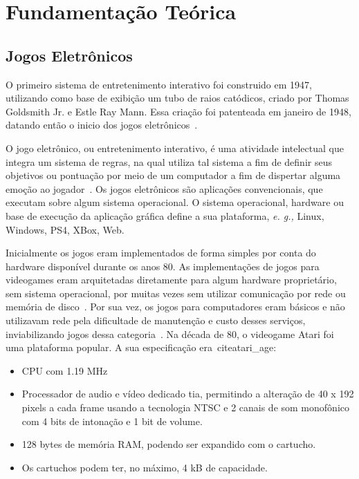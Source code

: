 \chapter{Fundamentação Teórica}
\label{cap2}

\section{Jogos Eletrônicos}

O primeiro sistema de entretenimento interativo foi construido em 1947, utilizando como base de exibição um tubo de raios catódicos, criado por Thomas Goldsmith Jr. e Estle Ray Mann.
%
Essa criação foi patenteada em janeiro de 1948, datando então o inicio dos jogos eletrônicos~\cite{Adams2014Jan, patents1947Jan}.



O jogo eletrônico, ou entretenimento interativo, é uma atividade intelectual que integra um sistema de regras, na qual utiliza tal sistema a fim de definir seus objetivos ou pontuação por meio de um computador a fim de dispertar alguma emoção ao jogador~\cite{video_game_technologies}.
%
Os jogos eletrônicos são aplicações convencionais, que executam sobre algum sistema operacional.
%
O sistema operacional, hardware ou base de execução da aplicação gráfica define a sua plataforma, \textit{e. g.,} Linux, Windows, PS4, XBox, Web.



Inicialmente os jogos eram implementados de forma simples por conta do hardware disponível durante os anos 80.
%
As implementações de jogos para videogames eram arquitetadas diretamente para algum hardware proprietário, sem sistema operacional, por muitas vezes sem utilizar comunicação por rede ou memória de disco~\cite{adams_1208533}.
%
Por sua vez, os jogos para computadores eram básicos e não utilizavam rede pela dificultade de manutenção e custo desses serviços, inviabilizando jogos dessa categoria~\cite{adams_1208533}.
%
Na década de 80, o videogame Atari foi uma plataforma popular. A sua especificação era~cite{atari_age}:

\begin{itemize}
  \item \ac{CPU} com 1.19 \ac{MHz}
  \item Processador de audio e vídeo dedicado \ac{tia}, permitindo a alteração de 40 x 192 pixels a cada frame usando a tecnologia \ac{NTSC} e 2 canais de som monofônico com 4 bits de intonação e 1 bit de volume.
  \item 128 bytes de memória \ac{RAM}, podendo ser expandido com o cartucho.
  \item Os cartuchos podem ter, no máximo, 4 kB de capacidade.
\end{itemize}

